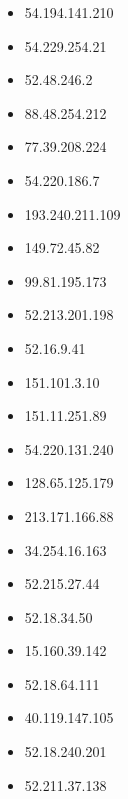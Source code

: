 \documentclass{article}
\begin{document}
\begin{itemize}
        \item 54.194.141.210
    
        \item 54.229.254.21
    
        \item 52.48.246.2
    
        \item 88.48.254.212
    
        \item 77.39.208.224
    
        \item 54.220.186.7
    
        \item 193.240.211.109
    
        \item 149.72.45.82
    
        \item 99.81.195.173
    
        \item 52.213.201.198
    
        \item 52.16.9.41
    
        \item 151.101.3.10
    
        \item 151.11.251.89
    
        \item 54.220.131.240
    
        \item 128.65.125.179
    
        \item 213.171.166.88
    
        \item 34.254.16.163
    
        \item 52.215.27.44
    
        \item 52.18.34.50
    
        \item 15.160.39.142
    
        \item 52.18.64.111
    
        \item 40.119.147.105
    
        \item 52.18.240.201
    
        \item 52.211.37.138
    

\end{itemize}
\end{document}
